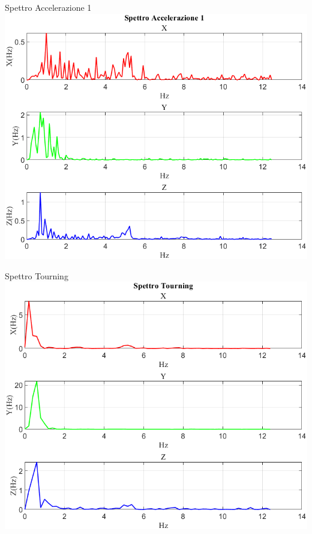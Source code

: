 \documentclass[beamer]{standalone}
\begin{document}
	\begin{frame}{{Spettro Accelerazione 1}}
		\centering\includegraphics[height=.8\textheight]{figure/Mag/Trasformata/Spettro Accelerazione 1}
	\end{frame}
	
	\begin{frame}{{Spettro Tourning}}
		\centering\includegraphics[height=.8\textheight]{figure/Mag/Trasformata/Spettro Tourning}
	\end{frame}
	
\end{document}
